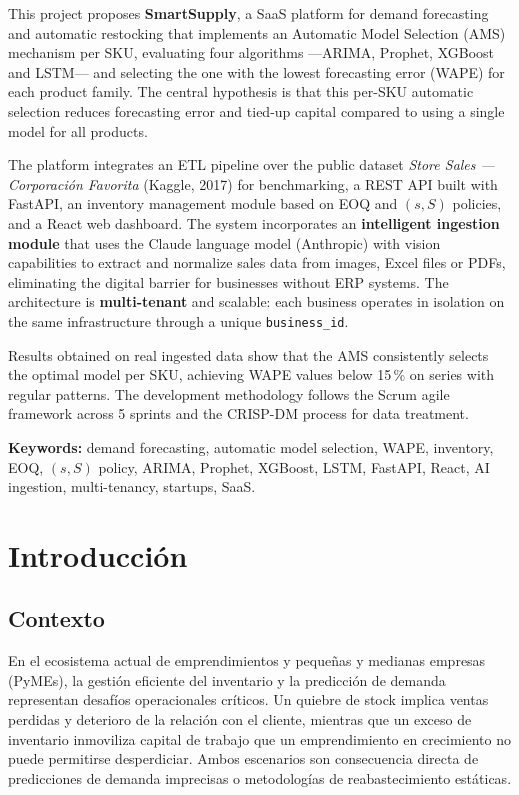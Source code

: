 \documentclass[12pt, a4paper]{report}
\begin{document}
This project proposes \textbf{SmartSupply}, a SaaS platform for demand forecasting and
automatic restocking that implements an Automatic Model Selection (AMS) mechanism per
SKU, evaluating four algorithms —ARIMA, Prophet, XGBoost and LSTM— and selecting the
one with the lowest forecasting error (WAPE) for each product family. The central
hypothesis is that this per-SKU automatic selection reduces forecasting error and
tied-up capital compared to using a single model for all products.

The platform integrates an ETL pipeline over the public dataset \textit{Store Sales —
Corporación Favorita} (Kaggle, 2017) for benchmarking, a REST API built with FastAPI, an
inventory management module based on EOQ and $(s,S)$ policies, and a React web
dashboard. The system incorporates an \textbf{intelligent ingestion module} that uses the
Claude language model (Anthropic) with vision capabilities to extract and normalize sales
data from images, Excel files or PDFs, eliminating the digital barrier for businesses
without ERP systems. The architecture is \textbf{multi-tenant} and scalable: each
business operates in isolation on the same infrastructure through a unique
\texttt{business\_id}.

Results obtained on real ingested data show that the AMS consistently selects the
optimal model per SKU, achieving WAPE values below 15\,\% on series with regular
patterns. The development methodology follows the Scrum agile framework across 5 sprints
and the CRISP-DM process for data treatment.

\textbf{Keywords:} demand forecasting, automatic model selection, WAPE, inventory, EOQ,
$(s,S)$ policy, ARIMA, Prophet, XGBoost, LSTM, FastAPI, React, AI ingestion,
multi-tenancy, startups, SaaS.

\newpage

\chapter{Introducción}

\section{Contexto}

En el ecosistema actual de emprendimientos y pequeñas y medianas empresas (PyMEs),
la gestión eficiente del inventario y la predicción de demanda representan desafíos
operacionales críticos. Un quiebre de stock implica ventas perdidas y deterioro de la
relación con el cliente, mientras que un exceso de inventario inmoviliza capital de trabajo
que un emprendimiento en crecimiento no puede permitirse desperdiciar. Ambos escenarios
son consecuencia directa de predicciones de demanda imprecisas o metodologías de
reabastecimiento estáticas.
\end{document}
